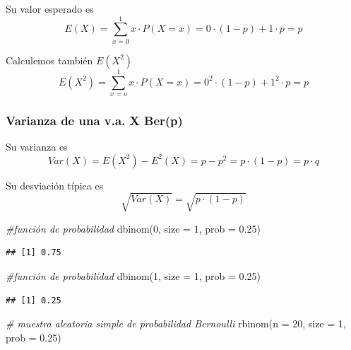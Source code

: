 \documentclass[
]{article}
\newenvironment{Shaded}{\begin{snugshade}}{\end{snugshade}}
\newcommand{\AttributeTok}[1]{\textcolor[rgb]{0.77,0.63,0.00}{#1}}
\newcommand{\CommentTok}[1]{\textcolor[rgb]{0.56,0.35,0.01}{\textit{#1}}}
\newcommand{\DecValTok}[1]{\textcolor[rgb]{0.00,0.00,0.81}{#1}}
\newcommand{\FloatTok}[1]{\textcolor[rgb]{0.00,0.00,0.81}{#1}}
\newcommand{\FunctionTok}[1]{\textcolor[rgb]{0.00,0.00,0.00}{#1}}
\newcommand{\NormalTok}[1]{#1}
\begin{document}
Su valor esperado es
\[E(X) = \sum_{x=0}^1 x\cdot P(X=x) = 0\cdot(1-p)+1\cdot p = p\]

Calculemos también \(E(X^2)\)
\[E(X^2) = \sum_{x=o}^1 x\cdot P(X=x) = 0^2 \cdot (1-p) + 1^2\cdot p = p\]

\hypertarget{varianza-de-una-v.a.-x-berp}{%
\subsubsection{Varianza de una v.a. X
Ber(p)}\label{varianza-de-una-v.a.-x-berp}}

Su varianza es
\[Var(X) = E(X^2) - E^2(X) = p-p^2 = p\cdot (1-p) = p\cdot q\]

Su desviación típica es \[\sqrt{Var(X)}=\sqrt{p\cdot (1-p)}\]

\begin{Shaded}
\begin{Highlighting}[]
\CommentTok{\#función de probabilidad}
\FunctionTok{dbinom}\NormalTok{(}\DecValTok{0}\NormalTok{, }\AttributeTok{size =} \DecValTok{1}\NormalTok{, }\AttributeTok{prob =} \FloatTok{0.25}\NormalTok{)}
\end{Highlighting}
\end{Shaded}

\begin{verbatim}
## [1] 0.75
\end{verbatim}

\begin{Shaded}
\begin{Highlighting}[]
\CommentTok{\#función de probabilidad}
\FunctionTok{dbinom}\NormalTok{(}\DecValTok{1}\NormalTok{, }\AttributeTok{size =} \DecValTok{1}\NormalTok{, }\AttributeTok{prob =} \FloatTok{0.25}\NormalTok{)}
\end{Highlighting}
\end{Shaded}

\begin{verbatim}
## [1] 0.25
\end{verbatim}

\begin{Shaded}
\begin{Highlighting}[]
\CommentTok{\# muestra aleatoria simple de probabilidad Bernoulli}
\FunctionTok{rbinom}\NormalTok{(}\AttributeTok{n =} \DecValTok{20}\NormalTok{, }\AttributeTok{size =} \DecValTok{1}\NormalTok{, }\AttributeTok{prob =} \FloatTok{0.25}\NormalTok{)}
\end{Highlighting}
\end{Shaded}
\end{document}
